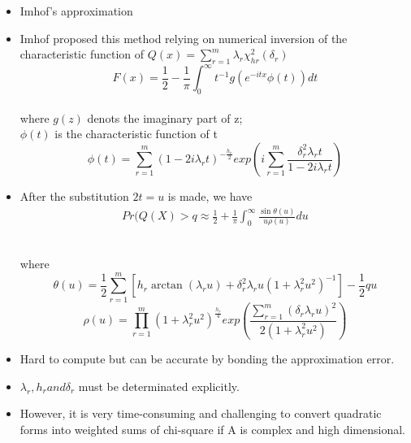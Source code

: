 \documentclass[10pt]{beamer}
\begin{document}
\begin{frame}
	\begin{itemize}
		\item Imhof's approximation
		\item Imhof proposed this method relying on numerical inversion of the characteristic function of $Q(x)=\sum_{r=1}^m\lambda_r\chi_{hr}^2(\delta_r)$	
		\[F(x)=\frac{1}{2}-\frac{1}{\pi}\int_{0}^{\infty}t^{-1}g(e^{-itx}\phi(t))dt\]\\
		where $g(z)$ denots the imaginary part of z;\\
		$\phi(t)$ is the characteristic function of t
		\[\phi(t)=\sum_{r=1}^m(1-2i\lambda_rt)^{-\frac{h_r}{2}}exp(i\sum_{r=1}^m\frac{\delta_r^2\lambda_rt}{1-2i\lambda_rt})\]
	\end{itemize}
\end{frame}

\begin{frame}
	\begin{itemize}
		\item After the substitution $2t=u$ is made, we have
		\begin{align}
	Pr(Q(X)>q\approx\frac{1}{2}+\frac{1}{\pi}\int_{0}^{\infty}\frac{\sin\theta(u)}{u\rho(u)}du 
	    \end{align}
	\begin{small}\\		
	where \[\theta(u)=\frac{1}{2}\sum_{r=1}^m[h_r\arctan(\lambda_ru)+\delta_r^2\lambda_ru(1+\lambda_r^2u^2)^{-1}]-\frac{1}{2}qu\]
	\[\rho(u)=\prod_{r=1}^m(1+\lambda_r^2u^2)^{\frac{h_r}{4}}exp(\frac{\sum_{r=1}^m(\delta_r\lambda_ru)^2}{2(1+\lambda_r^2u^2)})\]
	\end{small}
	\item Hard to compute but can be accurate by bonding the approximation error.
	\item $\lambda_r, h_r  and  \delta_r$ must be determinated explicitly. 
	\item However, it is very time-consuming and challenging to convert quadratic forms into weighted sums of chi-square if A is complex and high dimensional.
	\end{itemize}
\end{frame}
\end{document}
